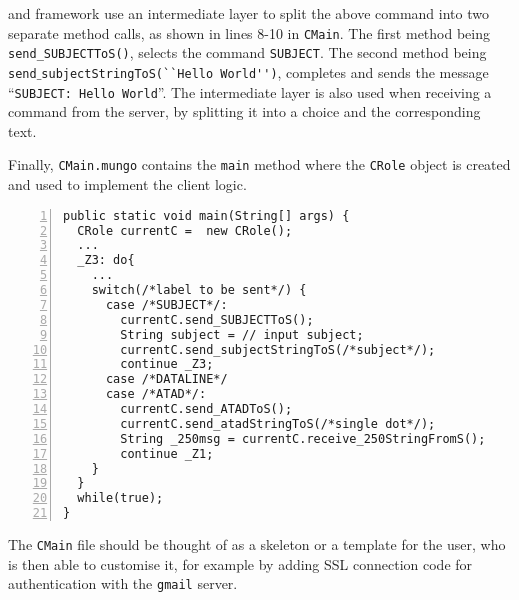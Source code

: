 %
\StMungo and \Mungo framework use an intermediate layer to split the above command into
two separate method calls, as shown in lines 8-10 in \lstinline|CMain|.
The first method being \lstinline|send_SUBJECTToS()|, selects the command \lstinline|SUBJECT|.
The second method being
\lstinline|send|$\_$\lstinline|subjectStringToS(``Hello World'')|, completes and sends the message
``\lstinline|SUBJECT: Hello World|''.
The intermediate layer is also used when receiving a command from the server,
by splitting it into a choice and the corresponding text.

Finally, \lstinline|CMain.mungo| contains the \lstinline|main| method
where the \lstinline|CRole| object is created and used to implement the
client logic.
\begin{lstlisting}[numbers=left]
public static void main(String[] args) {
  CRole currentC =  new CRole();
  ...
  _Z3: do{
    ...
    switch(/*label to be sent*/) {
      case /*SUBJECT*/:
        currentC.send_SUBJECTToS();
        String subject = // input subject;
        currentC.send_subjectStringToS(/*subject*/);
        continue _Z3;
      case /*DATALINE*/
      case /*ATAD*/:
        currentC.send_ATADToS();
        currentC.send_atadStringToS(/*single dot*/);
        String _250msg = currentC.receive_250StringFromS();
        continue _Z1;
    }
  }
  while(true);
}
\end{lstlisting}
The \lstinline|CMain| file should be thought of as a skeleton or a
template for the user, who is then able to customise it, for example by
adding SSL connection code for authentication with the \lstinline|gmail|
server.